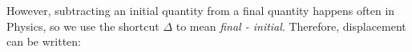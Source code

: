       
      \label{m38788*id63061}However, subtracting an initial quantity from a final quantity happens often in Physics, so we use the shortcut \begin{math}\Delta \end{math} to mean \textsl{final - initial}. Therefore, displacement can be written:\par 
      \label{m38788*id63080}\nopagebreak\noindent{}
    
